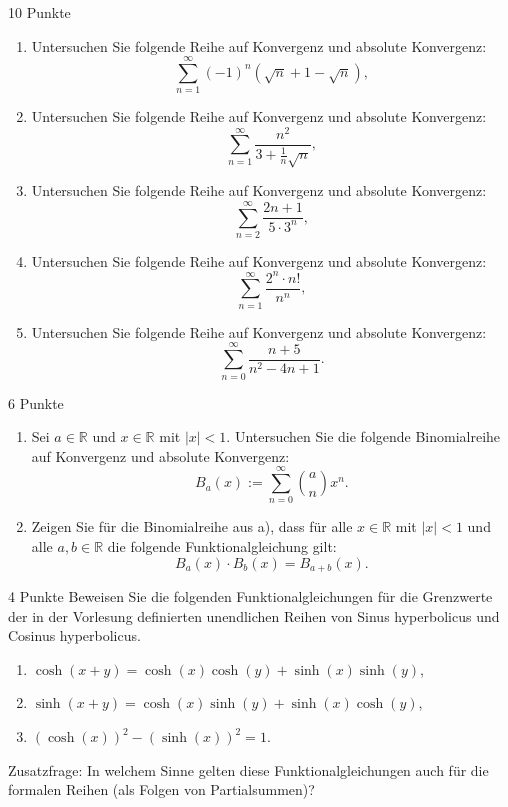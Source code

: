 \documentclass{../problemset}
\author{Michael van Straten}
\begin{document}
\maketitle

\begin{problem}{10 Punkte}
\begin{enumerate}
	\item Untersuchen Sie folgende Reihe auf Konvergenz und absolute Konvergenz:
	      \[
		      \sum_{n=1}^{\infty} (-1)^n(\sqrt{n} + 1 - \sqrt{n}),
	      \]
	\item Untersuchen Sie folgende Reihe auf Konvergenz und absolute Konvergenz:
	      \[
		      \sum_{n=1}^{\infty} \frac{n^2}{3 + \frac{1}{n}\sqrt{n}},
	      \]
	\item Untersuchen Sie folgende Reihe auf Konvergenz und absolute Konvergenz:
	      \[
		      \sum_{n=2}^{\infty} \frac{2n+1}{5 \cdot 3^n},
	      \]
	\item Untersuchen Sie folgende Reihe auf Konvergenz und absolute Konvergenz:
	      \[
		      \sum_{n=1}^{\infty} \frac{2^n \cdot n!}{n^n},
	      \]
	\item Untersuchen Sie folgende Reihe auf Konvergenz und absolute Konvergenz:
	      \[
		      \sum_{n=0}^{\infty} \frac{n + 5}{n^2 - 4n + 1}.
	      \]
\end{enumerate}
\end{problem}

\begin{problem}[Binomialreihe]{6 Punkte}
\begin{enumerate}
	\item Sei $a \in \mathbb{R}$ und $x \in \mathbb{R}$ mit $|x| < 1$. Untersuchen Sie die folgende Binomialreihe auf Konvergenz und absolute Konvergenz:
	      \[
		      B_a(x) := \sum_{n=0}^{\infty} \binom{a}{n}x^n.
	      \]
	\item Zeigen Sie für die Binomialreihe aus a), dass für alle $x \in \mathbb{R}$ mit $|x| < 1$ und alle $a, b \in \mathbb{R}$ die folgende Funktionalgleichung gilt:
	      \[
		      B_a(x) \cdot B_b(x) = B_{a+b}(x).
	      \]
\end{enumerate}
\end{problem}

\begin{problem}{4 Punkte}
Beweisen Sie die folgenden Funktionalgleichungen für die Grenzwerte der in der Vorlesung definierten unendlichen Reihen von Sinus hyperbolicus und Cosinus hyperbolicus.
\begin{enumerate}
	\item $\cosh(x + y) = \cosh(x) \cosh(y) + \sinh(x) \sinh(y)$,
	\item $\sinh(x + y) = \cosh(x) \sinh(y) + \sinh(x) \cosh(y)$,
	\item $(\cosh(x))^2 - (\sinh(x))^2 = 1$.
\end{enumerate}
Zusatzfrage: In welchem Sinne gelten diese Funktionalgleichungen auch für die formalen Reihen (als Folgen von Partialsummen)?
\end{problem}
\end{document}
